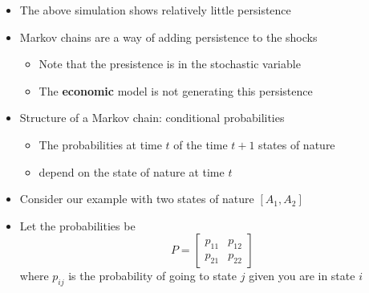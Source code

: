\documentclass[notes=show]{beamer}
\begin{document}
\begin{frame}%



\end{frame}%

\begin{frame}%


\begin{itemize}
\item The above simulation shows relatively little persistence

\item Markov chains are a way of adding persistence to the shocks

\begin{itemize}
\item Note that the presistence is in the stochastic variable

\item The \textbf{economic} model is not generating this persistence
\end{itemize}

\item Structure of a Markov chain: conditional probabilities

\begin{itemize}
\item The probabilities at time $t$ of the time $t+1$ states of nature

\item depend on the state of nature at time $t$
\end{itemize}

\item Consider our example with two states of nature $\left[ A_{1},A_{2}%
\right] $

\item Let the probabilities be%
\[
P=\left[ 
\begin{array}{cc}
p_{11} & p_{12} \\ 
p_{21} & p_{22}%
\end{array}%
\right] 
\]%
where $p_{ij}$ is the probability of going to state $j$ given you are in
state $i$
\end{itemize}

\end{frame}%
\end{document}
